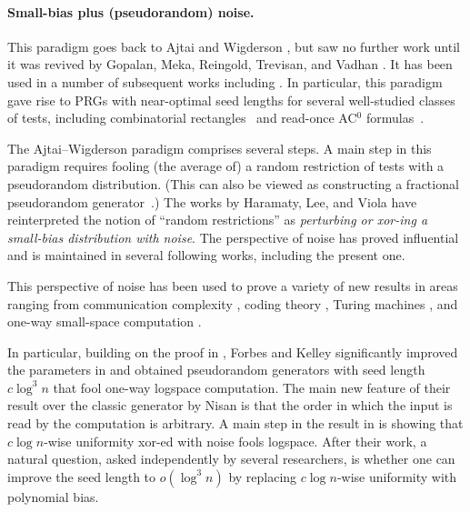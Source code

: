 \paragraph{Small-bias plus (pseudorandom) noise.}
This paradigm goes back to Ajtai and Wigderson \cite{AjtaiW89}, but saw no further work until it was revived by Gopalan, Meka, Reingold, Trevisan, and Vadhan \cite{GopalanMRTV12}. It has been used in a number
of subsequent works including \cite{GavinskyLS12,ReingoldSV13,SVW17,HLV-bipnfp,LeeV-rop,CHRT18,ForbesKelley-2018,MRT19,Lee19,DBLP:conf/coco/DoronHH20,CLTW23}.
In particular, this paradigm gave rise to PRGs with near-optimal seed lengths for several well-studied classes of tests, including combinatorial rectangles~\cite{GopalanMRTV12,Lee19} and read-once AC$^0$ formulas~\cite{DHH19,DBLP:conf/coco/DoronHH20}.

The Ajtai--Wigderson paradigm comprises several steps.
A main step in this paradigm requires fooling (the average of) a random restriction of tests with a pseudorandom distribution.
(This can also be viewed as constructing a fractional pseudorandom generator~\cite{CHHL19,CHLT19,CGLSS21}.)
The works by Haramaty, Lee, and Viola \cite{LV-sum,HLV-bipnfp,LeeV-rop,Lee19}
have reinterpreted the notion of ``random restrictions'' as \emph{perturbing or xor-ing a small-bias distribution with noise}.
The perspective of noise has proved influential and is maintained in several following works, including the present one.


This perspective of noise has been used to prove a variety of new results in areas ranging from communication complexity \cite{HLV-bipnfp}, coding theory \cite{HLV-bipnfp,DBLP:conf/focs/SilbakKS19}, Turing machines \cite{viola-tm}, and one-way small-space computation \cite{ForbesKelley-2018,MRT19}.


In particular, building on the proof in \cite{HLV-bipnfp}, Forbes and Kelley \cite{ForbesKelley-2018}
significantly improved the parameters in \cite{HLV-bipnfp} and obtained pseudorandom generators with seed length $c\log^3 n$ that fool one-way logspace computation.  The main new feature of their result over the classic generator by Nisan \cite{Nis92} is that the order in which the input is read by the computation is arbitrary.  A main step in the result in \cite{ForbesKelley-2018} is showing that $c\log n$-wise uniformity xor-ed with noise fools logspace.  After their work, a natural question, asked independently by several researchers, is whether one can improve the seed length to $o(\log^3 n)$ by replacing $c \log n$-wise uniformity with polynomial bias.

